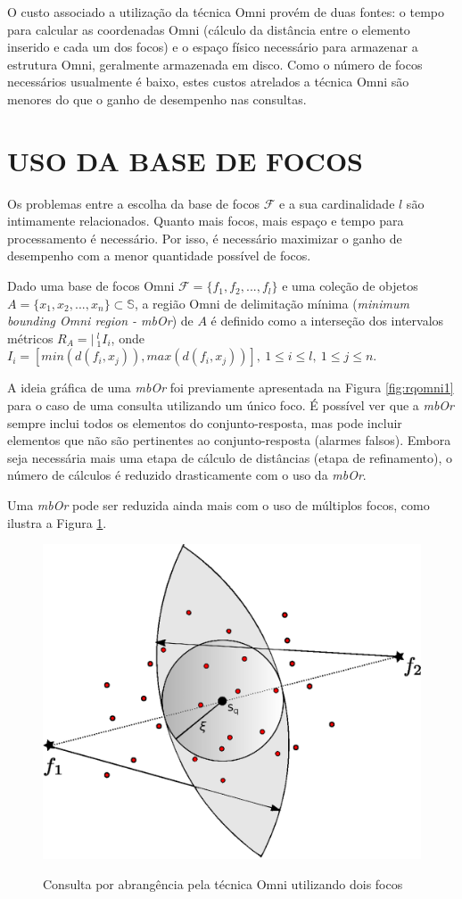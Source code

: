 O custo associado a utilização da técnica Omni provém de duas fontes: o tempo para calcular as coordenadas Omni (cálculo da distância
entre o elemento inserido e cada um dos focos) e o espaço físico necessário para armazenar a estrutura Omni, geralmente armazenada em disco.
Como o número de focos necessários usualmente é baixo, estes custos atrelados a técnica Omni são menores do que o ganho
de desempenho nas consultas.

\section{USO DA BASE DE FOCOS}
Os problemas entre a escolha da base de focos $\mathscr{F}$ e a sua cardinalidade $l$ são intimamente relacionados. Quanto
mais focos, mais espaço e tempo para processamento é necessário. Por isso, é necessário maximizar o ganho de desempenho com
a menor quantidade possível de focos.

\begin{mydef}
 Dado uma base de focos Omni $\mathscr{F} = \{f_1, f_2, ..., f_l\}$ e uma coleção de objetos $A = \{x_1,x_2,...,x_n\} \subset \mathbb{S}$, a
 região Omni de delimitação mínima (\textit{minimum bounding Omni region - mbOr}) de $A$ é definido como a interseção
 dos intervalos métricos $R_A = |\  ^{l}_{1}I_i$, onde $I_i = [min(d(f_i,x_j)), max(d(f_i,x_j))],\ 1\leq i \leq l,\ 1 \leq j \leq n$. 
\end{mydef}

A ideia gráfica de uma \textit{mbOr} foi previamente apresentada na Figura \ref{fig:rqomni1} para o caso de uma consulta utilizando um único foco.
É possível ver que a \textit{mbOr} sempre inclui todos os elementos do conjunto-resposta, mas pode incluir elementos que não são pertinentes
ao conjunto-resposta (alarmes falsos). Embora seja necessária mais uma etapa de cálculo de distâncias (etapa de refinamento), o número de cálculos é
reduzido drasticamente com o uso da \textit{mbOr}.\par

Uma \textit{mbOr} pode ser reduzida ainda mais com o uso de múltiplos focos, como ilustra a Figura \ref{fig:rqomni2}.

\begin{figure}[H]
\centering
\caption{Consulta por abrangência pela técnica Omni utilizando dois focos}
\includegraphics[width=.6\textwidth]{dados/figuras/rg_omni_2.eps}
\label{fig:rqomni2}
\end{figure}
								
